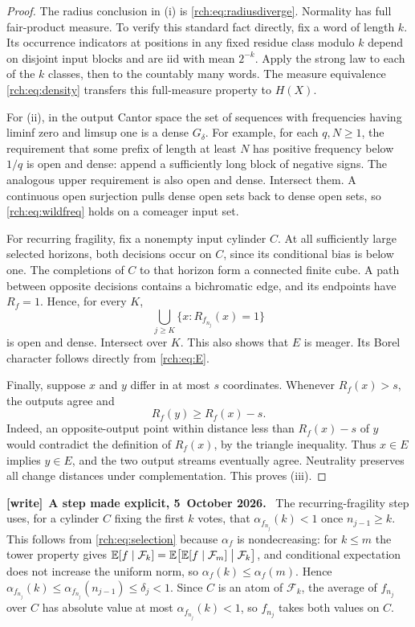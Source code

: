 \documentclass[11pt]{article}
\theoremstyle{definition}
\theoremstyle{remark}
\newcommand{\E}{\mathbb E}
\newcommand{\cF}{\mathcal F}
\newenvironment{writenote}[1][]{\par\smallskip\begingroup\small
 \noindent\textbf{[write]}\if\relax\detokenize{#1}\relax\else~\textbf{#1.}\fi\ }%
 {\par\endgroup\smallskip}
\begin{document}
\begin{proof}
The radius conclusion in (i) is \eqref{rch:eq:radiusdiverge}. Normality has full
fair-product measure. To verify this standard fact directly, fix a word of
length \(k\). Its occurrence indicators at positions in any fixed residue
class modulo \(k\) depend on disjoint input blocks and are iid with mean
\(2^{-k}\). Apply the strong law to each of the \(k\) classes, then to the
countably many words. The measure equivalence \eqref{rch:eq:density} transfers this
full-measure property to \(H(X)\).

For (ii), in the output Cantor space the set of sequences with frequencies
having liminf zero and limsup one is a dense \(G_\delta\). For example, for
each \(q,N\ge1\), the requirement that some prefix of length at least \(N\)
has positive frequency below \(1/q\) is open and dense: append a sufficiently
long block of negative signs. The analogous upper requirement is also open and
dense. Intersect them. A continuous open surjection pulls dense open sets back
to dense open sets, so \eqref{rch:eq:wildfreq} holds on a comeager input set.

For recurring fragility, fix a nonempty input cylinder \(C\). At all
sufficiently large selected horizons, both decisions occur on \(C\), since
its conditional bias is below one. The completions of \(C\) to that horizon
form a connected finite cube. A path between opposite decisions contains a
bichromatic edge, and its endpoints have \(R_f=1\). Hence, for every \(K\),
\[
 \bigcup_{j\ge K}\{x:R_{f_{n_j}}(x)=1\}
\]
is open and dense. Intersect over \(K\). This also shows that \(E\) is
meager. Its Borel character follows directly from \eqref{rch:eq:E}.

Finally, suppose \(x\) and \(y\) differ in at most \(s\) coordinates.
Whenever \(R_f(x)>s\), the outputs agree and
\begin{equation}
 R_f(y)\ge R_f(x)-s.
 \label{rch:eq:radiuslipschitz}
\end{equation}
Indeed, an opposite-output point within distance less than \(R_f(x)-s\) of
\(y\) would contradict the definition of \(R_f(x)\), by the triangle
inequality. Thus \(x\in E\) implies \(y\in E\), and the two output
streams eventually agree. Neutrality preserves all change distances under
complementation. This proves (iii).
\end{proof}

\begin{writenote}[A step made explicit, 5~October 2026]
The recurring-fragility step uses, for a cylinder $C$ fixing the first $k$
votes, that $\alpha_{f_{n_j}}(k)<1$ once $n_{j-1}\ge k$. This follows from
\eqref{rch:eq:selection} because $\alpha_f$ is nondecreasing: for
$k\le m$ the tower property gives
$\E[f\mid\cF_k]=\E\bigl[\E[f\mid\cF_m]\bigm|\cF_k\bigr]$, and conditional
expectation does not increase the uniform norm, so
$\alpha_f(k)\le\alpha_f(m)$. Hence
$\alpha_{f_{n_j}}(k)\le\alpha_{f_{n_j}}(n_{j-1})\le\delta_j<1$. Since $C$ is
an atom of $\cF_k$, the average of $f_{n_j}$ over $C$ has absolute value at
most $\alpha_{f_{n_j}}(k)<1$, so $f_{n_j}$ takes both values on $C$.
\end{writenote}
\end{document}

